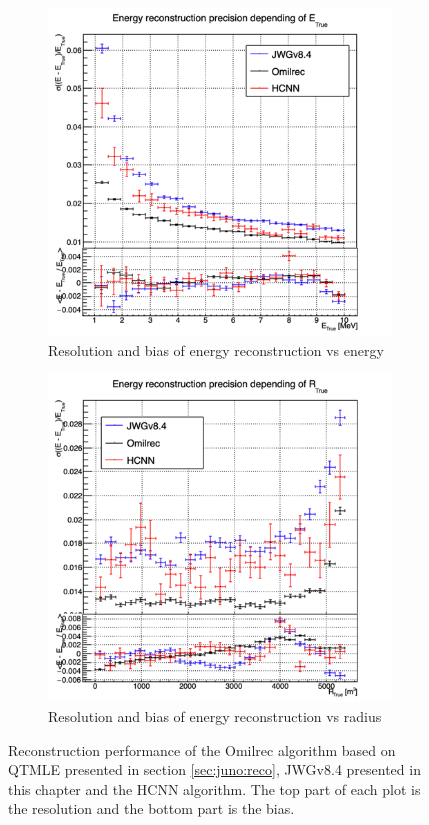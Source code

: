 \documentclass[../main.tex]{subfiles}
\begin{document}
\begin{figure}[ht]
  \centering
  \begin{subfigure}[t]{0.48\linewidth}
    \centering
    \includegraphics[width=\linewidth]{images/jgnn/hcnn/MESBvETC.png}
    \caption{Resolution and bias of energy reconstruction vs energy}
    \label{fig:jgnn:MESBvETC_hcnn}
  \end{subfigure}
  \begin{subfigure}[t]{0.48\linewidth}
    \centering
    \includegraphics[width=\linewidth]{images/jgnn/hcnn/MESBvRTC.png}
    \caption{Resolution and bias of energy reconstruction vs radius}
    \label{fig:jgnn:MESBvRTC_hcnn}
  \end{subfigure}
  \caption{Reconstruction performance of the Omilrec algorithm based on QTMLE presented in section \ref{sec:juno:reco}, JWGv8.4 presented in this chapter and the HCNN algorithm. The top part of each plot is the resolution and the bottom part is the bias.}
  \label{fig:jgnn:results_hcnn_1}
\end{figure}
\end{document}
